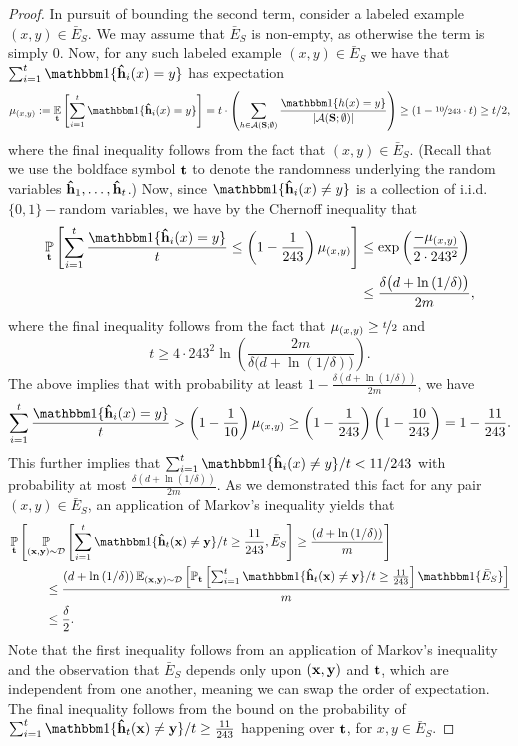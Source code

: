 \begin{proof}
In pursuit of bounding the second term, consider a labeled example $ (x,y)\in\bar{E}_{S}$. We may assume that $ \bar{E}_{S} $ is non-empty, as otherwise the term is simply $0$.
Now, for any such labeled example $(x,y) \in \bar{E}_{S}$ we have that  $ \sum_{i=1}^{t} \ind\{ \rh_{i}(x)=y \} $  has expectation 
\[ \mu_{(x,y)}:=\e_{\rt}\left[\sum_{i=1}^{t} \ind\{ \rh_{i}(x)=y \}\right]=t\cdot\left(\sum_{h\in \erm(\rS;\emptyset)} \frac{\ind\{ h(x)=y \}}{|\erm(\rS;\emptyset)|} \right)\geq (1-\nicefrac{10}{243} \cdot t ) \geq t/2, \] 
where the final inequality follows from the fact that $ (x,y)\in \bar{E}_{S}$. (Recall that we use the boldface symbol $\mathbf{t}$ to denote the randomness underlying the random variables $ \mathbf{\hat{h}}_{1},\ldots,\mathbf{\hat{h}}_{t}$.)  
Now, since $ \ind\{ \rh_{i}(x)\not=y \} $ is a collection of i.i.d.\ $\{0,1\}-$random variables, we have by the Chernoff inequality that 
\begin{align*}
 \p_{\rt} \left[\sum_{i=1}^{t} \frac{\ind\{ \rh_{i}(x)=y \}}{t} \leq \left (1-\frac{1}{243} \right)\mu_{(x,y)}\right] &\leq \exp{\left(\frac{-\mu_{(x,y)}}{2\cdot 243^{2}}\right)} \\
 & \leq \frac{\delta\big(d+\ln{\left(1/\delta \right)}\big)}{2m}, 
\end{align*}
where the final inequality follows from the fact that $ \mu_{(x,y)}\geq \nicefrac t2 $ and  
\[ t\geq 4\cdot 243^{2}\ln\left(\frac{2m}{\delta\big(d+\ln{\left(1/\delta \right)}\big)} \right). \]  
The above implies that with probability at least $ 1-\frac{\delta(d+\ln{\left(1/\delta \right)})}{2m}$, we have  
\[ \sum_{i=1}^{t} \frac{\ind\{ \rh_{i}(x)=y \}}{t} > \left( 1-\frac{1}{10} \right) \mu_{(x,y)} \geq \left( 1- \frac{1}{243} \right) \left( 1 - \frac{10}{243} \right) = 1 - \frac{11}{243}. \] 
This further implies that $ \sum_{i=1}^{t} \ind\{ \rh_{i}(x)\not=y \}/t< 11/243$  with probability at most $ \frac{\delta(d+\ln{\left(1/\delta \right)})}{2m}$.
As we demonstrated this fact for any pair $(x,y)\in \bar{E}_{S}$, an application of Markov's inequality yields that 
\begin{align}\label{eq:uppsampledbound2}
 &\p_{\rt}\left[\p_{(\rx,\ry)\sim \cD}\left[\sum_{i=1}^{t} \ind\{   \rh_{t}(\rx)\not=\ry\}/t\geq\frac{11}{243}, \bar{E}_{S}\right]\geq \frac{(d+\ln{\left(1/\delta \right)})}{m}\right] \hspace{2cm} \notag 
 \\
& \qquad \quad \leq \frac{(d+\ln{\left(1/\delta \right)})\e_{(\rx,\ry)\sim \cD}\left[ \p_{\rt} \left[\sum_{i=1}^{t} \ind\{   \rh_{t}(\rx)\not=\ry\}/t\geq\frac{11}{243}\right] \ind \{   \bar{E}_{S}\} \right]}{m} \notag \\
& \qquad \quad \leq \frac{\delta}{2}. 
\end{align}
Note that the first inequality follows from an application of Markov's inequality and the observation that $ \bar{E}_{S} $ depends only upon $ (\mathbf{x},\mathbf{y})$ and $ \mathbf{t} $, which are independent from one another, meaning we can swap the order of expectation. 
The final inequality follows from the bound on the probability of $ \sum_{i=1}^{t} \ind\{   \rh_{t}(\rx)\not=\ry\}/t\geq\frac{11}{243}  $ happening over $ \mathbf{t} $,  for $ x,y\in\bar{E}_{S}$.


\end{proof}
